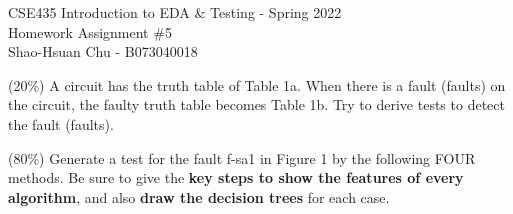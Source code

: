 \documentclass[12pt,answers]{exam}
\begin{document}
\begin{center}
\LARGE CSE435 Introduction to EDA \& Testing - Spring 2022 \\
\Large Homework Assignment \#5 \\
\Large Shao-Hsuan Chu - B073040018 \\
\end{center}
\bigskip

\begin{questions}
  \question (20\%) A circuit has the truth table of Table 1a. When there is a fault (faults) on the circuit, the faulty truth table becomes Table 1b. Try to derive tests to detect the fault (faults).
  
  \begin{solution}
  \end{solution}

  \question (80\%) Generate a test for the fault f-sa1 in Figure 1 by the following FOUR methods. Be sure to give the \textbf{key steps to show the features of every algorithm}, and also \textbf{draw the decision trees} for each case.
   


\end{questions}
\end{document}
